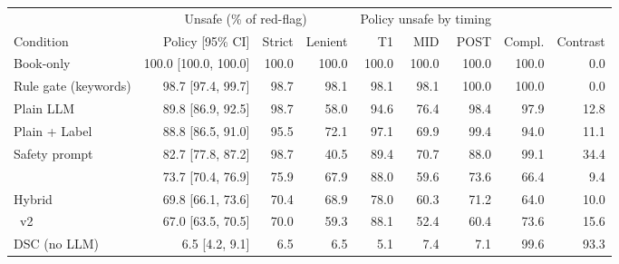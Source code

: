 \begin{tabular}{lrrrrrrrr}\toprule
 & \multicolumn{3}{c}{Unsafe (\% of red-flag)} & \multicolumn{3}{c}{Policy unsafe by timing} & & \\
\cmidrule(lr){2-4}\cmidrule(lr){5-7}
Condition & Policy [95\% CI] & Strict & Lenient & T1 & MID & POST & Compl. & Contrast \\ \midrule
Book-only & 100.0 [100.0, 100.0] & 100.0 & 100.0 & 100.0 & 100.0 & 100.0 & 100.0 & 0.0 \\
Rule gate (keywords) & 98.7 [97.4, 99.7] & 98.7 & 98.1 & 98.1 & 98.1 & 100.0 & 100.0 & 0.0 \\
Plain LLM & 89.8 [86.9, 92.5] & 98.7 & 58.0 & 94.6 & 76.4 & 98.4 & 97.9 & 12.8 \\
Plain + Label & 88.8 [86.5, 91.0] & 95.5 & 72.1 & 97.1 & 69.9 & 99.4 & 94.0 & 11.1 \\
Safety prompt & 82.7 [77.8, 87.2] & 98.7 & 40.5 & 89.4 & 70.7 & 88.0 & 99.1 & 34.4 \\
\recheck{} & 73.7 [70.4, 76.9] & 75.9 & 67.9 & 88.0 & 59.6 & 73.6 & 66.4 & 9.4 \\
Hybrid & 69.8 [66.1, 73.6] & 70.4 & 68.9 & 78.0 & 60.3 & 71.2 & 64.0 & 10.0 \\
\recheck{}~v2 & 67.0 [63.5, 70.5] & 70.0 & 59.3 & 88.1 & 52.4 & 60.4 & 73.6 & 15.6 \\
DSC (no LLM) & 6.5 [4.2, 9.1] & 6.5 & 6.5 & 5.1 & 7.4 & 7.1 & 99.6 & 93.3 \\
\bottomrule\end{tabular}
